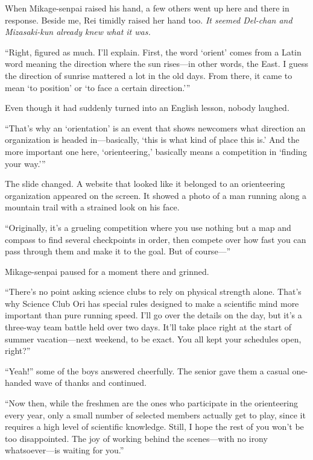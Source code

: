 \documentclass[
    a4paper,
    12pt,
    twoside,
    openany,
    UTF8,
    fontset=windows
]{ctexbook}
\begin{document}
When Mikage-senpai raised his hand, a few others went up here and there in response. Beside me, Rei timidly raised her hand too. \textit{It seemed Del-chan and Mizasaki-kun already knew what it was.}

``Right, figured as much. I'll explain. First, the word `orient' comes from a Latin word meaning the direction where the sun rises---in other words, the East. I guess the direction of sunrise mattered a lot in the old days. From there, it came to mean `to position' or `to face a certain direction.'''

Even though it had suddenly turned into an English lesson, nobody laughed.

``That's why an `orientation' is an event that shows newcomers what direction an organization is headed in---basically, `this is what kind of place this is.' And the more important one here, `orienteering,' basically means a competition in `finding your way.'''

The slide changed. A website that looked like it belonged to an orienteering organization appeared on the screen. It showed a photo of a man running along a mountain trail with a strained look on his face.

``Originally, it's a grueling competition where you use nothing but a map and compass to find several checkpoints in order, then compete over how fast you can pass through them and make it to the goal. But of course---''

Mikage-senpai paused for a moment there and grinned.

``There's no point asking science clubs to rely on physical strength alone. That's why Science Club Ori has special rules designed to make a scientific mind more important than pure running speed. I'll go over the details on the day, but it's a three-way team battle held over two days. It'll take place right at the start of summer vacation---next weekend, to be exact. You all kept your schedules open, right?''

``Yeah!'' some of the boys answered cheerfully. The senior gave them a casual one-handed wave of thanks and continued.

``Now then, while the freshmen are the ones who participate in the orienteering every year, only a small number of selected members actually get to play, since it requires a high level of scientific knowledge. Still, I hope the rest of you won't be too disappointed. The joy of working behind the scenes---with no irony whatsoever---is waiting for you.''
\end{document}
